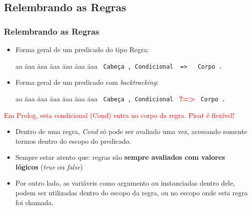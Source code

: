 \subsection{Relembrando as Regras}
\begin{frame}[c, fragile, allowframebreaks=0.75]
	\frametitle{Relembrando as Regras}
    
    \begin{itemize}
        \item Forma geral de um predicado do tipo Regra:
    
        \begin{tabbing}
          aa \= aaa \= aaa \= aaa \= aaa \= aaa \= aaa \kill
          \> \> \verb+ Cabeça , Condicional  =>   Corpo .+ 
        \end{tabbing}
        
        \item  Forma geral de um predicado com \textit{backtracking}:
        
        \begin{tabbing}
          aa \= aaa \= aaa \= aaa \= aaa \= aaa \= aaa \kill
            \> \> \verb+ Cabeça , Condicional + \textbf{\textcolor{red}{?=>}} \verb+ Corpo .+
        \end{tabbing}
    \end{itemize}
    
    \textcolor{red}{Em Prolog, esta condicional (Cond) entra no corpo da regra. Picat é flexível!}

    \framebreak
    
    \begin{itemize}
        \framebreak
        
        \item Dentro de uma regra, \emph{Cond} só pode ser avaliado uma vez, acessando somente termos dentro do escopo do predicado.
        
        \item Sempre estar atento que: regras são \textbf{sempre avaliados com valores lógicos} ({\em true} ou {\em false})
        
        \item Por outro lado, as variáveis  como argumento ou  instanciadas
        dentro dele, podem ser utilizadas dentro do escopo da regra, 
        ou no escopo onde  esta regra foi chamada.
    \end{itemize}
    
\end{frame}

